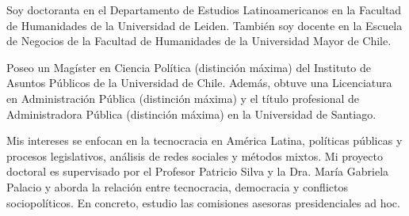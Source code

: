 




\par{Soy doctoranta en el Departamento de Estudios Latinoamericanos en la Facultad de Humanidades de la Universidad de Leiden. También soy docente en la Escuela de Negocios de la Facultad de Humanidades de la Universidad Mayor de Chile. 

Poseo un Magíster en Ciencia Política (distinción máxima) del Instituto de Asuntos Públicos de la Universidad de Chile. Además, obtuve una Licenciatura en Administración Pública (distinción máxima) y el título profesional de Administradora Pública (distinción máxima) en la Universidad de Santiago.

Mis intereses se enfocan en la tecnocracia en América Latina, políticas públicas y procesos legislativos, análisis de redes sociales y métodos mixtos. Mi proyecto doctoral es supervisado por el Profesor Patricio Silva y la Dra. María Gabriela Palacio y aborda la relación entre tecnocracia, democracia y conflictos sociopolíticos. En concreto, estudio las comisiones asesoras presidenciales ad hoc.}\\